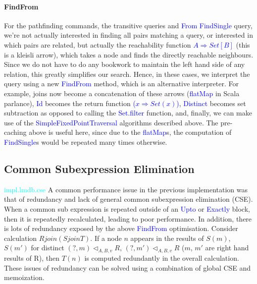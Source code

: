 \documentclass[12pt,a4paper,twoside,openright]{report}
\newcommand\codeName[1]{\textcolor{blue}{#1}}
\newcommand\note[1]{\textcolor{cyan}{#1}}
\newcommand{\opRule}[3]{#1 \triangleleft_{#2, v} #3}
\begin{document}
{{		\paragraph{FindFrom}
		For the pathfinding commands, the transitive queries and \codeName{From} \codeName{FindSingle} query, we're not actually interested in finding all pairs matching a query, or interested in which pairs are related, but actually the reachability function \codeName{$A \Rightarrow Set[B]$} (this is a kleisli arrow), which takes a node and finds the directly reachable neighbours. Since we do not have to do any bookwork to maintain the left hand side of any relation, this greatly simplifies our search. Hence, in these cases, we interpret the query using a new \codeName{FindFrom} method, which is an alternative interpreter. For example, joins now become a concatenation of these arrows (\codeName{flatMap}  in Scala parlance), \codeName{Id} becomes the return function \codeName{($x \Rightarrow Set(x)$)}, \codeName{Distinct} becomes set subtraction as opposed to calling the \codeName{Set.filter} function, and, finally, we can make use of the \codeName{SimpleFixedPointTraversal} algorithms described above. The pre-caching above is useful here, since due to the \codeName{flatMap}s, the computation of \codeName{FindSingle}s would be repeated many times otherwise.

	\subsection{Common Subexpression Elimination}
	\note{impl.lmdb.cse}
	A common performance issue in the previous implementation was that of redundancy and lack of general common subexpression elimination (CSE). When a common sub expression is repeated outside of an \codeName{Upto} or \codeName{Exactly} block, then it is repeatedly recalculated, leading to poor performance. In addition, there is lots of redundancy exposed by the above \codeName{FindFrom} optimisation. Consider calculation $R join (S join T)$. If a node $n$ appears in the results of $S(m)$, $S(m')$ for distinct $\opRule{(?, m)}{A, B}{R}$, $\opRule{(?, m')}{A, B}{R}$ ($m$, $m'$ are right hand results of R), then $T(n)$ is computed redundantly in the overall calculation. These issues of redundancy can be solved using a combination of global CSE and memoization.

}}
\end{document}
